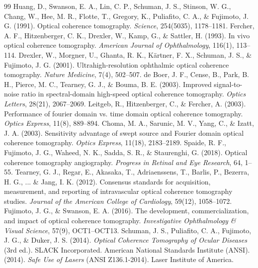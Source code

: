 \documentclass[11pt,a4paper]{article}
\begin{document}
\begin{thebibliography}{99}
 Huang, D., Swanson, E. A., Lin, C. P., Schuman, J. S., Stinson, W. G., Chang, W., Hee, M. R., Flotte, T., Gregory, K., Puliafito, C. A., \& Fujimoto, J. G. (1991). Optical coherence tomography. \textit{Science}, 254(5035), 1178--1181.
 Fercher, A. F., Hitzenberger, C. K., Drexler, W., Kamp, G., \& Sattler, H. (1993). In vivo optical coherence tomography. \textit{American Journal of Ophthalmology}, 116(1), 113--114.
 Drexler, W., Morgner, U., Ghanta, R. K., Kärtner, F. X., Schuman, J. S., \& Fujimoto, J. G. (2001). Ultrahigh-resolution ophthalmic optical coherence tomography. \textit{Nature Medicine}, 7(4), 502--507.
 de Boer, J. F., Cense, B., Park, B. H., Pierce, M. C., Tearney, G. J., \& Bouma, B. E. (2003). Improved signal-to-noise ratio in spectral-domain high-speed optical coherence tomography. \textit{Optics Letters}, 28(21), 2067--2069.
 Leitgeb, R., Hitzenberger, C., \& Fercher, A. (2003). Performance of fourier domain vs. time domain optical coherence tomography. \textit{Optics Express}, 11(8), 889--894.
 Choma, M. A., Sarunic, M. V., Yang, C., \& Izatt, J. A. (2003). Sensitivity advantage of swept source and Fourier domain optical coherence tomography. \textit{Optics Express}, 11(18), 2183--2189.
 Spaide, R. F., Fujimoto, J. G., Waheed, N. K., Sadda, S. R., \& Staurenghi, G. (2018). Optical coherence tomography angiography. \textit{Progress in Retinal and Eye Research}, 64, 1--55.
 Tearney, G. J., Regar, E., Akasaka, T., Adriaenssens, T., Barlis, P., Bezerra, H. G., ... \& Jang, I. K. (2012). Consensus standards for acquisition, measurement, and reporting of intravascular optical coherence tomography studies. \textit{Journal of the American College of Cardiology}, 59(12), 1058--1072.
 Fujimoto, J. G., \& Swanson, E. A. (2016). The development, commercialization, and impact of optical coherence tomography. \textit{Investigative Ophthalmology \& Visual Science}, 57(9), OCT1--OCT13.
 Schuman, J. S., Puliafito, C. A., Fujimoto, J. G., \& Duker, J. S. (2014). \textit{Optical Coherence Tomography of Ocular Diseases} (3rd ed.). SLACK Incorporated.
 American National Standards Institute (ANSI). (2014). \textit{Safe Use of Lasers} (ANSI Z136.1-2014). Laser Institute of America.
\end{thebibliography}
\end{document}
